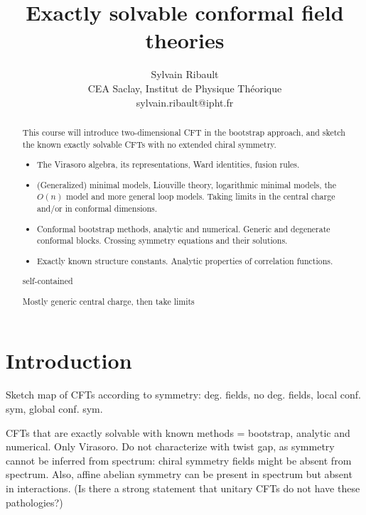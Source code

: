 \documentclass[12pt, a4paper]{article}
\title{\bfseries Exactly solvable conformal field theories}
\author{Sylvain Ribault \vspace{2mm}
\\
{\normalsize CEA Saclay, Institut de Physique Th\'eorique}
 \\
 {\footnotesize \ttfamily sylvain.ribault@ipht.fr }
}
\theoremstyle{break}
\begin{document}
\maketitle


\begin{abstract}
This course will introduce two-dimensional CFT in the bootstrap approach, and sketch the known exactly solvable CFTs with no extended chiral symmetry.
\begin{itemize}
 \item The Virasoro algebra, its representations, Ward identities, fusion rules.
 \item (Generalized) minimal models, Liouville theory, logarithmic minimal models, the $O(n)$ model and more general loop models. Taking limits in the central charge and/or in conformal dimensions. 
 \item Conformal bootstrap methods, analytic and numerical. Generic and degenerate conformal blocks. Crossing symmetry equations and their solutions. 
 \item Exactly known structure constants. Analytic properties of correlation functions. 
\end{itemize}
self-contained 

Mostly generic central charge, then take limits
\end{abstract}

\vspace{5mm}


\clearpage

\tableofcontents

\hypersetup{linkcolor=blue}

\setcounter{section}{-1}

\section{Introduction}

Sketch map of CFTs according to symmetry: deg. fields, no deg. fields, local conf. sym, global conf. sym.

CFTs that are exactly solvable with known methods = bootstrap, analytic and numerical. Only Virasoro. Do not characterize with twist gap, as symmetry cannot be inferred from spectrum: chiral symmetry fields might be absent from spectrum. Also, affine abelian symmetry can be present in spectrum but absent in interactions. (Is there a strong statement that unitary CFTs do not have these pathologies?)
\end{document}
